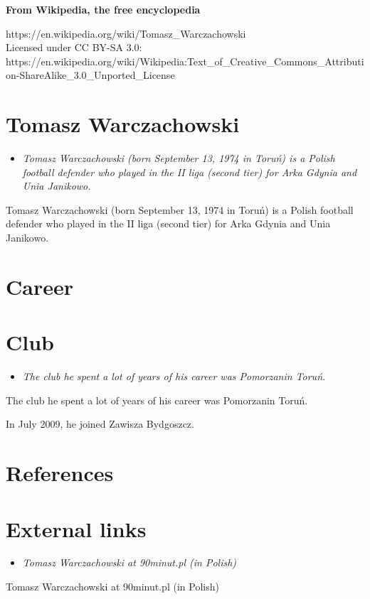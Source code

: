\textbf{From Wikipedia, the free encyclopedia}

https://en.wikipedia.org/wiki/Tomasz\_Warczachowski\\
Licensed under CC BY-SA 3.0:\\
https://en.wikipedia.org/wiki/Wikipedia:Text\_of\_Creative\_Commons\_Attribution-ShareAlike\_3.0\_Unported\_License

\section{Tomasz Warczachowski}\label{tomasz-warczachowski}

\begin{itemize}
\item
  \emph{Tomasz Warczachowski (born September 13, 1974 in Toruń) is a
  Polish football defender who played in the II liga (second tier) for
  Arka Gdynia and Unia Janikowo.}
\end{itemize}

Tomasz Warczachowski (born September 13, 1974 in Toruń) is a Polish
football defender who played in the II liga (second tier) for Arka
Gdynia and Unia Janikowo.

\section{Career}\label{career}

\section{Club}\label{club}

\begin{itemize}
\item
  \emph{The club he spent a lot of years of his career was Pomorzanin
  Toruń.}
\end{itemize}

The club he spent a lot of years of his career was Pomorzanin Toruń.

In July 2009, he joined Zawisza Bydgoszcz.

\section{References}\label{references}

\section{External links}\label{external-links}

\begin{itemize}
\item
  \emph{Tomasz Warczachowski at 90minut.pl (in Polish)}
\end{itemize}

Tomasz Warczachowski at 90minut.pl (in Polish)
